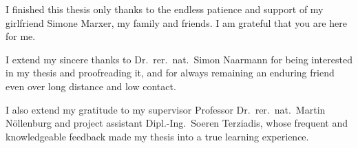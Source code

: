 \documentclass[draft,final]{vutinfth} %
\begin{document}
\frontmatter %

\addstatementpage


\begin{acknowledgements*}
I finished this thesis only thanks to the endless patience and support of my girlfriend Simone Marxer, my family and friends. I am grateful that you are here for me.

I extend my sincere thanks to Dr.\ rer.\ nat.\ Simon Naarmann for being interested in my thesis and proofreading it, and for always remaining an enduring friend even over long distance and low contact.

I also extend my gratitude to my supervisor Professor Dr.\ rer.\ nat.\ Martin Nöllenburg and project assistant Dipl.-Ing.\ Soeren Terziadis, whose frequent and knowledgeable feedback made my thesis into a true learning experience.
\end{acknowledgements*}
\end{document}
